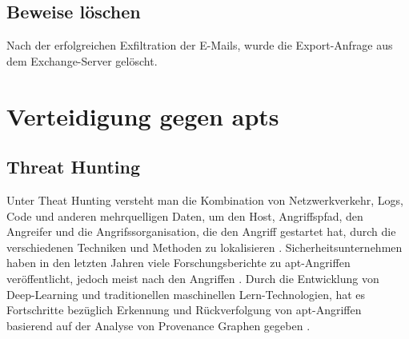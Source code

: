\documentclass[conference]{IEEEtran}
\begin{document}
\subsection{Beweise löschen}
Nach der erfolgreichen Exfiltration der E-Mails, wurde die Export-Anfrage aus dem Exchange-Server gelöscht.

\section{Verteidigung gegen \aclp{apt}}
\subsection{Threat Hunting}
Unter Theat Hunting versteht man die Kombination von Netzwerkverkehr, Logs, Code und anderen mehrquelligen Daten, um den Host, Angriffspfad, den Angreifer und die Angrifssorganisation, die den Angriff gestartet hat, durch die verschiedenen Techniken und Methoden zu lokalisieren \cite{Chen2022}.
Sicherheitsunternehmen haben in den letzten Jahren viele Forschungsberichte zu \ac{apt}-Angriffen veröffentlicht, jedoch meist nach den Angriffen \cite{Chen2022}.
Durch die Entwicklung von Deep-Learning und traditionellen maschinellen Lern-Technologien, hat es Fortschritte bezüglich Erkennung und Rückverfolgung von \ac{apt}-Angriffen basierend auf der Analyse von Provenance Graphen gegeben \cite{Chen2022}.
\end{document}
